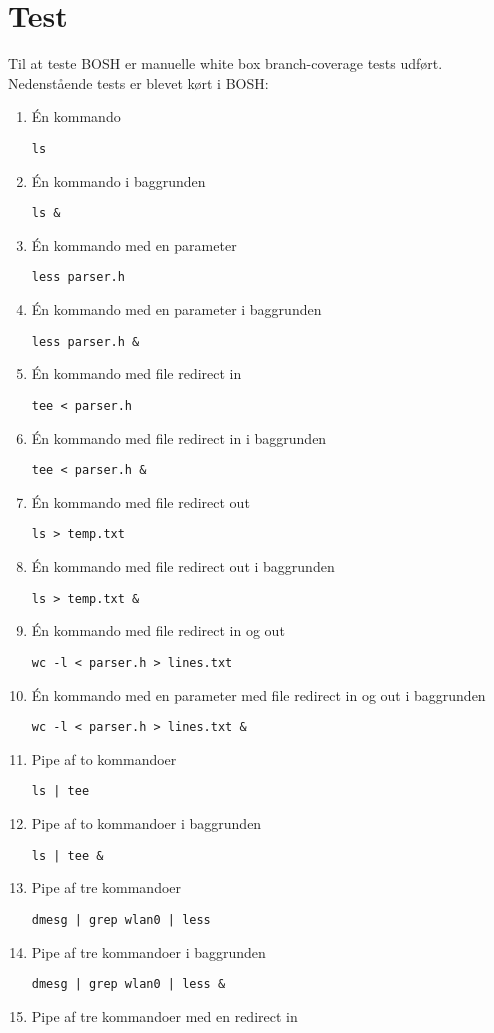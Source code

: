 \section{Test}
Til at teste BOSH er manuelle white box branch-coverage tests udført.\\

Nedenstående tests er blevet kørt i BOSH:

\begin{enumerate}
	\item Én kommando
	
	\texttt{ls}
	\item Én kommando i baggrunden
	
	\texttt{ls \&}
	\item Én kommando med en parameter
	
	\texttt{less parser.h}
	\item Én kommando med en parameter i baggrunden
	
	\texttt{less parser.h \&}
	\item Én kommando med file redirect in
	
	\texttt{tee < parser.h}
	\item Én kommando med file redirect in i baggrunden
	
	\texttt{tee < parser.h \&}
	\item Én kommando med file redirect out
	
	\texttt{ls > temp.txt}
	\item Én kommando med file redirect out i baggrunden
	
	\texttt{ls > temp.txt \&}
	\item Én kommando med file redirect in og out
	
	\texttt{wc -l < parser.h > lines.txt}
	\item Én kommando med en parameter med file redirect in og out i baggrunden
	
	\texttt{wc -l < parser.h > lines.txt \&}
	\item Pipe af to kommandoer
	
	\texttt{ls | tee}
	\item Pipe af to kommandoer i baggrunden
	
	\texttt{ls | tee \&}
	\item Pipe af tre kommandoer
	
	\texttt{dmesg | grep wlan0 | less}
	\item Pipe af tre kommandoer i baggrunden
	
	\texttt{dmesg | grep wlan0 | less \&}
	\item  Pipe af tre kommandoer med en redirect in
	

\end{enumerate}
